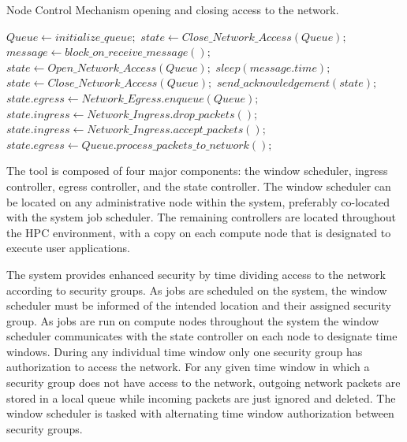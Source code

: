 \documentclass[oneside,12pt]{memoir}
\begin{document}
\begin{algorithm}
	\caption{Node Control Mechanism opening and closing access to the network.}
	\label{alg:node_controller}
	\begin{algorithmic}[1]
		\Statex
			\State $Queue \gets initialize\_queue;$
				\State $state \gets Close\_Network\_Access(Queue);$
					\State $message \gets block\_on\_receive\_message();$
				\EndWhile
				\State $state \gets Open\_Network\_Access(Queue);$
				\State $sleep(message.time);$
				\State $state \gets Close\_Network\_Access(Queue);$
				\State $send\_acknowledgement(state);$
			\EndWhile
		\EndFunction
		\Statex
			\State $state.egress \gets Network\_Egress.enqueue(Queue);$
			\State $state.ingress \gets Network\_Ingress.drop\_packets();$
			\State {}
		\EndFunction
		\Statex
			\State $state.ingress \gets Network\_Ingress.accept\_packets();$
			\State $state.egress \gets Queue.process\_packets\_to\_network();$
			\State {}
		\EndFunction
	\end{algorithmic}
\end{algorithm}	
		
The tool is composed of four major components:  the window scheduler, ingress controller, egress controller, and the state controller. The window scheduler can be located on any administrative node within the system, preferably co-located with the system job scheduler. The remaining controllers are located throughout the HPC environment, with a copy on each compute node that is designated to execute user applications. 

The system provides enhanced security by time dividing access to the network according to security groups. As jobs are scheduled on the system, the window scheduler must be informed of the intended location and their assigned security group. As jobs are run on compute nodes throughout the system the window scheduler communicates with the state controller on each node to designate time windows. During any individual time window only one security group has authorization to access the network. For any given time window in which a security group does not have access to the network, outgoing network packets are stored in a local queue while incoming packets are just ignored and deleted. The window scheduler is tasked with alternating time window authorization between security groups.
\end{document}
